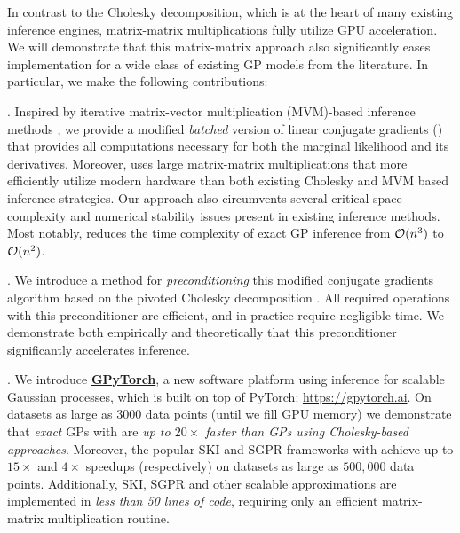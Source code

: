 In contrast to the Cholesky decomposition, which is at the heart of many existing inference engines, matrix-matrix multiplications fully utilize GPU acceleration.
We will demonstrate that this matrix-matrix approach also significantly eases implementation for a wide class of existing GP models from the literature.
In particular, we make the following contributions:

. Inspired by iterative matrix-vector multiplication (MVM)-based inference methods  \cite{cunningham2008fast,saatcci2012scalable,wilson2015kernel,wilson2015thoughts,dong2017scalable}, we provide a modified \emph{batched} version of linear conjugate gradients (\mcgacro{}) that provides all computations necessary for both the marginal likelihood and its derivatives.
Moreover, \mcgacro{} uses large matrix-matrix multiplications that more efficiently utilize modern hardware than both existing Cholesky and MVM based inference strategies.
Our approach also circumvents several critical space complexity and numerical stability issues present in existing inference methods.
Most notably, \mmacro{} reduces the time complexity of exact GP inference from $\bigo{n^3}$ to $\bigo{n^2}$.

. We introduce a method for \emph{preconditioning} this modified conjugate gradients algorithm based on the pivoted Cholesky decomposition \cite{bach2013sharp,harbrecht2012low}.
All required operations with this preconditioner are efficient, and in practice require negligible time.
We demonstrate both empirically and theoretically that this preconditioner significantly accelerates inference.

. We introduce \textbf{\href{https://gpytorch.ai}{GPyTorch}}, a new software platform using \mmacro{} inference for
scalable Gaussian processes, which is built on top of PyTorch: \url{https://gpytorch.ai}.
On datasets as large as $3000$ data points (until we fill GPU memory) we demonstrate that \emph{exact} GPs with \mmacro{} are \emph{up to $20\times$ faster than GPs using Cholesky-based approaches}.
Moreover, the popular SKI \cite{wilson2015kernel} and SGPR \cite{titsias2009variational} frameworks with \mmacro{} achieve up to $15\times$ and $4\times$ speedups (respectively) on datasets as large as $500,\!000$ data points.
Additionally, SKI, SGPR and other scalable approximations are implemented in \emph{less than 50 lines of code}, requiring only an efficient matrix-matrix multiplication routine.

